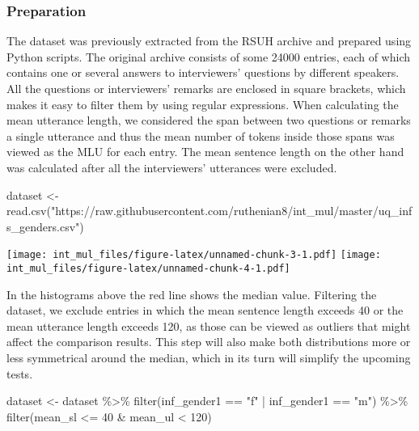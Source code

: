 \documentclass[
]{article}
\newenvironment{Shaded}{\begin{snugshade}}{\end{snugshade}}
\newcommand{\DecValTok}[1]{\textcolor[rgb]{0.00,0.00,0.81}{#1}}
\newcommand{\FunctionTok}[1]{\textcolor[rgb]{0.00,0.00,0.00}{#1}}
\newcommand{\NormalTok}[1]{#1}
\newcommand{\OtherTok}[1]{\textcolor[rgb]{0.56,0.35,0.01}{#1}}
\newcommand{\SpecialCharTok}[1]{\textcolor[rgb]{0.00,0.00,0.00}{#1}}
\newcommand{\StringTok}[1]{\textcolor[rgb]{0.31,0.60,0.02}{#1}}
\begin{document}
\hypertarget{preparation}{%
\subsubsection{Preparation}\label{preparation}}

The dataset was previously extracted from the RSUH archive and prepared
using Python scripts. The original archive consists of some 24000
entries, each of which contains one or several answers to interviewers'
questions by different speakers. All the questions or interviewers'
remarks are enclosed in square brackets, which makes it easy to filter
them by using regular expressions. When calculating the mean utterance
length, we considered the span between two questions or remarks a single
utterance and thus the mean number of tokens inside those spans was
viewed as the MLU for each entry. The mean sentence length on the other
hand was calculated after all the interviewers' utterances were
excluded.

\begin{Shaded}
\begin{Highlighting}[]
\NormalTok{dataset }\OtherTok{\textless{}{-}} \FunctionTok{read.csv}\NormalTok{(}\StringTok{"https://raw.githubusercontent.com/ruthenian8/int\_mul/master/uq\_infs\_genders.csv"}\NormalTok{)}
\end{Highlighting}
\end{Shaded}

\texttt{[image: int\_mul\_files/figure-latex/unnamed-chunk-3-1.pdf]}
\texttt{[image: int\_mul\_files/figure-latex/unnamed-chunk-4-1.pdf]}

In the histograms above the red line shows the median value. Filtering
the dataset, we exclude entries in which the mean sentence length
exceeds 40 or the mean utterance length exceeds 120, as those can be
viewed as outliers that might affect the comparison results. This step
will also make both distributions more or less symmetrical around the
median, which in its turn will simplify the upcoming tests.

\begin{Shaded}
\begin{Highlighting}[]
\NormalTok{dataset }\OtherTok{\textless{}{-}}\NormalTok{ dataset }\SpecialCharTok{\%\textgreater{}\%}
  \FunctionTok{filter}\NormalTok{(inf\_gender1 }\SpecialCharTok{==} \StringTok{"f"} \SpecialCharTok{|}\NormalTok{ inf\_gender1 }\SpecialCharTok{==} \StringTok{"m"}\NormalTok{) }\SpecialCharTok{\%\textgreater{}\%} 
  \FunctionTok{filter}\NormalTok{(mean\_sl }\SpecialCharTok{\textless{}=} \DecValTok{40} \SpecialCharTok{\&}\NormalTok{ mean\_ul }\SpecialCharTok{\textless{}} \DecValTok{120}\NormalTok{)}
\end{Highlighting}
\end{Shaded}
\end{document}
